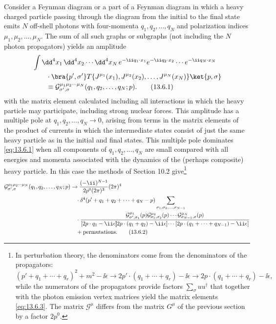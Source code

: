Consider a Feynman diagram or a part of a Feynman diagram in which
a heavy charged particle passing through the diagram from the initial to
the final state emits $N$ off-shell photons with four-momenta $q_1,q_2,\ldots,q_N$
and polarization indices $\mu_1,\mu_2,\ldots,\mu_N$. The sum of all such graphs or
subgraphs (not including the $N$ photon propagators) yields an amplitude
\begin{align}
&\int \dd^4x_1\,\dd^4x_2\cdots \dd^4x_N\,
e^{-\ii q_1\cdot x_1}e^{-\ii q_2\cdot x_2}\cdots e^{-\ii q_N\cdot x_N}
\notag\\
&\qquad\cdot\bra{p',\sigma'}T\{J^{\mu_1}(x_1),J^{\mu_2}(x_2),
\ldots,J^{\mu_N}(x_N)\}\ket{p,\sigma}
\notag\\
&\qquad\equiv\mathcal G^{\mu_1\mu_2\cdots\mu_N}_{\sigma',\sigma}
(q_1,q_2,\ldots,q_N;p).
\tag{13.6.1}\label{eq:13.6.1}
\end{align}
with the matrix element calculated including all interactions in which
the heavy particle may participate, including strong nuclear forces. This
amplitude has a multiple pole at $q_1,q_2,\ldots,q_N\to0$, arising from terms in
the matrix elements of the product of currents in which the intermediate
states consist of just the same heavy particle as in the initial and final states.
This multiple pole dominates \eqref{eq:13.6.1} when all components of $q_1,q_2,\ldots,q_N$
are small compared with all energies and momenta associated with the
dynamics of the (perhaps composite) heavy particle. In this case the
methods of Section 10.2 give\footnote{In perturbation theory, the denominators come from the denominators of the propagators:
\[
(p'+q_1+\cdots+q_r)^2+m^2-\ii\epsilon
\to2p'\cdot(q_1+\cdots+q_r)-\ii\epsilon
\to2p\cdot(q_1+\cdots+q_r)-\ii\epsilon,
\]
while the numerators of the propagators provide factors $\sum_\sigma uu^\dagger$
that together with the photon emission vertex matrices yield the matrix
elements \eqref{eq:13.6.3}. The matrix $\mathcal G^\mu$ differs from the matrix
$G^\mu$ of the previous section by a factor $2p^0$.}
\begin{align}
\mathcal G^{\mu_1\mu_2\cdots\mu_N}_{\sigma',\sigma}
(q_1,q_2,\ldots,q_N;p)
&\to\frac{(-\ii)^{N-1}}{2p^0(2\pi)^3}(2\pi)^4
\notag\\
&\quad\cdot\delta^4(p'+q_1+q_2+\cdots+q_N-p)
\sum_{\sigma_1,\sigma_2,\ldots,\sigma_{N-1}}
\notag\\
&\quad\cdot
\frac{\mathcal G^{\mu_1}_{\sigma',\sigma_1}(p)
\mathcal G^{\mu_2}_{\sigma_1,\sigma_2}(p)\cdots
\mathcal G^{\mu_N}_{\sigma_{N-1},\sigma}(p)}
{[2p\cdot q_1-\ii\epsilon]\!\!
[2p\cdot(q_1+q_2)-\ii\epsilon]\!\cdots
[2p\cdot(q_1+\cdots+q_{N-1})-\ii\epsilon]}
\notag\\
&\quad+\text{permutations}.
\tag{13.6.2}\label{eq:13.6.2}
\end{align}
